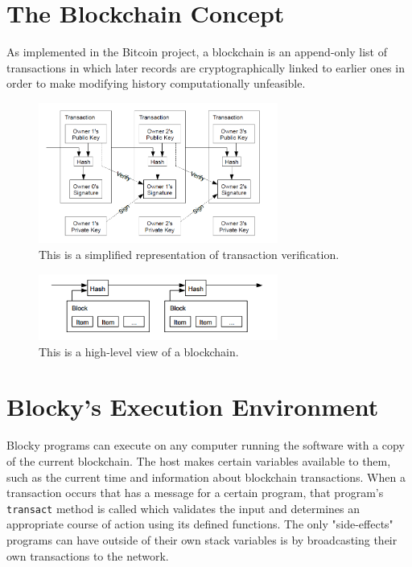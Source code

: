\documentclass[letterpaper]{article}
\begin{document}
\section{The Blockchain Concept}
As implemented in the Bitcoin project, a blockchain is an append-only list of transactions in which later records are cryptographically linked to earlier ones in order to make modifying history computationally unfeasible.

\begin{figure}[h]
\centering
\includegraphics[width=0.7\textwidth]{transaction_chain.png}
\caption{\label{fig:transaction_chain}This is a simplified representation of transaction verification\cite{nakamoto09}.}
\end{figure}

\begin{figure}[h]
\centering
\includegraphics[width=0.7\textwidth]{blockchain.png}
\caption{\label{fig:blockchain}This is a high-level view of a blockchain\cite{nakamoto09}.}
\end{figure}

\section{Blocky's Execution Environment}

Blocky programs can execute on any computer running the software with a copy of the current blockchain. The host makes certain variables available to them, such as the current time and information about blockchain transactions. When a transaction occurs that has a message for a certain program, that program's \texttt{transact} method is called which validates the input and determines an appropriate course of action using its defined functions. The only "side-effects" programs can have outside of their own stack variables is by broadcasting their own transactions to the network.
\end{document}
